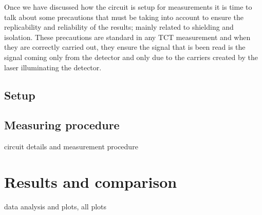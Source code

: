 Once we have discussed how the circuit is setup for measurements it is time to talk about some precautions that must be taking into account to ensure the replicability and reliability of the results; mainly related to shielding and isolation. These precautions are standard in any TCT measurement and when they are correctly carried out, they ensure the signal that is been read is the signal coming only from the detector and only due to the carriers created by the laser illuminating the detector.





\subsection{Setup} 
\subsection{Measuring procedure} 

circuit details and measurement procedure


\section{Results and comparison} %
\label{sec:future_projection}

data analysis and plots, all plots 


